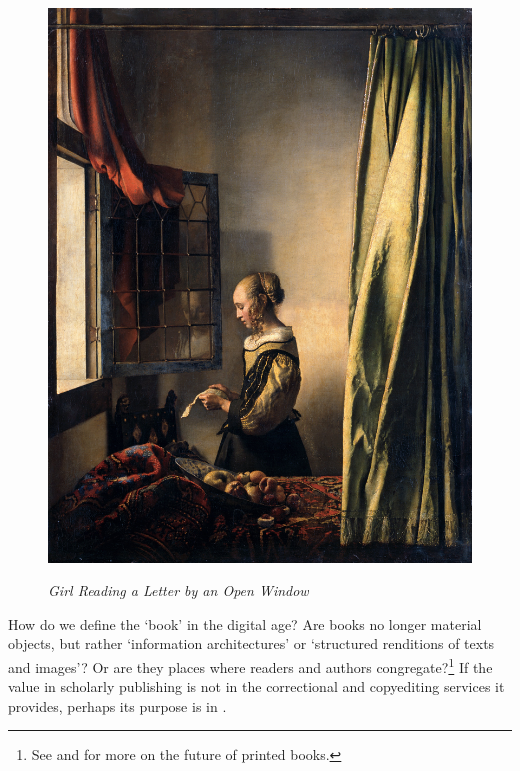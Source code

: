\documentclass[12pt,a4paper]{scrartcl}
\begin{document}
{}
\begin{figure}[H]
\includegraphics[scale=0.08]{images}
\centering
\caption{\textit{Girl Reading a Letter by an Open Window}}\protect\autocite{vermeer}
\label{Fig.3}
\centering
\end{figure}

How do we define the `book' in the digital age? Are books no longer material objects, but rather `information architectures' or `structured renditions of texts and images'? Or are they places where readers and authors congregate?\footnote{See \citeauthor{martin} and \citeauthor{jacobs} for more on the future of printed books.} If the value in scholarly publishing is not in the correctional and copyediting services it provides, perhaps its purpose is in  \cite[39]{martin}.


\clearpage
{}
{}
\printbibliography[heading=References]

\end{document}
